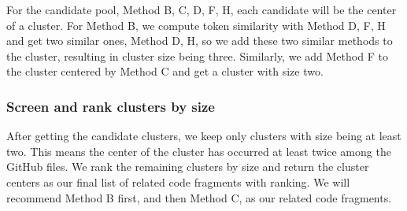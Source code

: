 For the candidate pool, {\ttt Method B, C, D, F, H}, each candidate will be the center of a cluster. For {\ttt Method B}, we compute token similarity with {\ttt Method D, F, H} and get two similar ones, {\ttt Method D, H}, so we add these two similar methods to the cluster, resulting in cluster size being three. Similarly, we add {\ttt Method F} to the cluster centered by {\ttt Method C} and get a cluster with size two.

\subsubsection{Screen and rank clusters by size}
After getting the candidate clusters, we keep only clusters with size being at least two. This means the center of the cluster has occurred at least twice among the GitHub files.
We rank the remaining clusters by size and return the cluster centers as our final list of related code fragments with ranking. We will recommend {\ttt Method B} first, and then {\ttt Method C}, as our related code fragments.